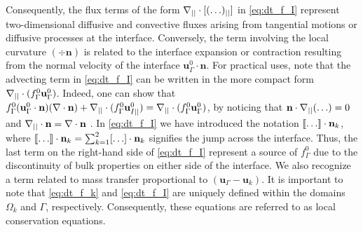 Consequently, the flux terms of the form $\mathbf{\nabla}_{||}\cdot[(\ldots)_{||}]$ in \ref{eq:dt_f_I} represent two-dimensional diffusive and convective fluxes arising from tangential motions or diffusive processes at the interface.
Conversely, the term involving the local curvature $(\div \textbf{n})$ is related to the interface expansion or contraction resulting from the normal velocity of the interface $\textbf{u}_\Gamma^0\cdot \textbf{n}$. For practical uses, note that the advecting term in \ref{eq:dt_f_I} can be written in the more compact form $\mathbf{\nabla}_{||}\cdot(f_\Gamma^0 \textbf{u}_\Gamma^0)$. 
Indeed, one can show that $f_\Gamma^0 (\textbf{u}_\Gamma^0 \cdot \textbf{n})(\mathbf{\nabla}\cdot \textbf{n})
+\mathbf{\nabla}_{||}\cdot(f_\Gamma^0 \textbf{u}_{I||}^0) = \mathbf{\nabla}_{||}\cdot(f_\Gamma^0 \textbf{u}_\Gamma^0)$, by noticing that $\textbf{n}\cdot\mathbf{\nabla}_{||}(\ldots) = 0$ and $\mathbf{\nabla}_{||}\cdot\textbf{n} = \mathbf{\nabla}\cdot\textbf{n}$ \citep{nadim1996concise}.
In \ref{eq:dt_f_I} we have introduced the notation $\llbracket \ldots \rrbracket \cdot \textbf{n}_k$, where $\llbracket \ldots \rrbracket \cdot \textbf{n}_k = \sum_{k=1}^2 [\ldots] \cdot \textbf{n}_k$ signifies the jump across the interface. Thus, the last term on the right-hand side of \ref{eq:dt_f_I} represent a source of $f_\Gamma^0$ due to the discontinuity of bulk properties on either side of the interface. We also recognize a term related to mass transfer proportional to $(\textbf{u}_\Gamma - \textbf{u}_k)$. %
It is important to note that \ref{eq:dt_f_k} and \ref{eq:dt_f_I} are uniquely defined within the domains $\Omega_k$ and $\Gamma$, respectively.
Consequently, these equations are referred to as local conservation equations.



 


